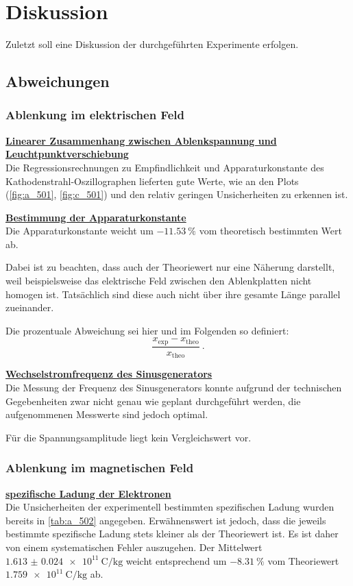 \section{Diskussion}
\label{sec:diskussion}

Zuletzt soll eine Diskussion der durchgeführten Experimente erfolgen.

\subsection{Abweichungen}

\newcommand{\dings}[2]{\hyperref[#1]{\textbf{#2}}\\}

\subsubsection*{Ablenkung im elektrischen Feld}
\dings{sec:auswertung:501:empfindlichkeit}{Linearer Zusammenhang zwischen Ablenkspannung und Leuchtpunktverschiebung}
Die Regressionsrechnungen zu Empfindlichkeit und Apparaturkonstante des Kathodenstrahl-Oszillographen
lieferten gute Werte,
wie an den Plots (\ref{fig:a_501}, \ref{fig:c_501})
und den relativ geringen Unsicherheiten zu erkennen ist.

\dings{sec:auswertung:501:apparaturkonstante}{Bestimmung der Apparaturkonstante}
Die Apparaturkonstante weicht um $\SI{-11.53}{\percent}$ vom theoretisch bestimmten Wert ab.

Dabei ist zu beachten,
dass auch der Theoriewert nur eine Näherung darstellt,
weil beispielsweise das elektrische Feld zwischen den Ablenkplatten nicht homogen ist.
Tatsächlich sind diese auch nicht über ihre gesamte Länge parallel zueinander.

Die prozentuale Abweichung sei hier und im Folgenden so definiert:
\[ \frac{x_\text{exp} - x_\text{theo}}{x_\text{theo}} \ . \]

\dings{sec:auswertung:501:frequenz}{Wechselstromfrequenz des Sinusgenerators}
Die Messung der Frequenz des Sinusgenerators
konnte aufgrund der technischen Gegebenheiten zwar nicht genau wie geplant durchgeführt werden,
die aufgenommenen Messwerte sind jedoch optimal.

Für die Spannungsamplitude liegt kein Vergleichswert vor.

\subsubsection*{Ablenkung im magnetischen Feld}
\dings{sec:auswertung:502:spezifische_elektronenladung}{spezifische Ladung der Elektronen}
Die Unsicherheiten der experimentell bestimmten spezifischen Ladung wurden bereits in \autoref{tab:a_502} angegeben.
Erwähnenswert ist jedoch,
dass die jeweils bestimmte spezifische Ladung stets kleiner als der Theoriewert ist.
Es ist daher von einem systematischen Fehler auszugehen.
Der Mittelwert $\SI{1.613(24) e11}{\coulomb\per\kilo\gram}$ weicht entsprechend um $\SI{-8.31}{\percent}$ vom Theoriewert
$\SI{1.759 e11}{\coulomb\per\kilo\gram}$ ab.

